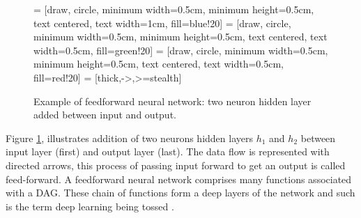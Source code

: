 \begin{figure}[H]
    \centering

 = [draw, circle, minimum width=0.5cm, minimum height=0.5cm, text centered, text width=1cm, fill=blue!20]
 = [draw, circle, minimum width=0.5cm, minimum height=0.5cm, text centered, text width=0.5cm, fill=green!20]
 = [draw, circle, minimum width=0.5cm, minimum height=0.5cm, text centered, text width=0.5cm, fill=red!20]
 = [thick,->,>=stealth]

\caption{Example of feedforward neural network: two neuron hidden layer added between input and output.}
   \label{fig:nn_hl} 
\end{figure}

Figure \ref{fig:nn_hl}, illustrates addition of two neurons hidden layers $h_1$ and $h_2$ between input layer (first) and output layer (last). The data flow is represented with directed arrows, this process of passing input forward to get an output is called feed-forward. A feedforward neural network comprises many functions associated with a \acl{DAG}. These chain of functions form a deep layers of the network and such is the term deep learning being tossed  \parencite[chapter 6]{Goodfellow-et-al-2016}.

